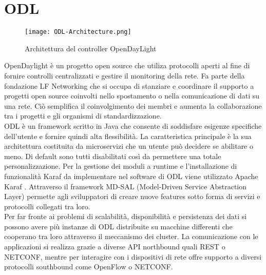 \chapter{ODL}
\begin{figure}[h]
    \centering
   \texttt{[image: ODL-Architecture.png]}
    \caption{Architettura del controller OpenDayLight}
    \label{fig:ArchODL}
\end{figure}
OpenDaylight \cite{ODL} è un progetto open source che utiliza protocolli aperti al fine di fornire controlli centralizzati e gestire il monitoring della rete.
Fa parte della fondazione LF Networking \cite{LFN} che si occupa di stanziare e coordinare il supporto a progetti open source coinvolti nello spostamento o nella comunicazione di dati su una rete.
Ciò semplifica il coinvolgimento dei membri e aumenta la collaborazione tra i progetti e gli organismi di standardizzazione.
\\ODL è un framework scritto in Java che consente di soddisfare esigenze specifiche dell'utente e fornire quindi alta flessibilità.
La caratteristica principale è la sua architettura costituita da microservizi che un utente può decidere se abilitare o meno. 
Di default sono tutti disabilitati così da permettere una totale personalizzazione.
Per la gestione dei moduli a runtime e l'installazione di funzionalità Karaf da implementare nel software di ODL viene utilizzato Apache Karaf \cite{Apache}.
Attraverso il framework MD-SAL (Model-Driven Service Abstraction Layer) permette agli sviluppatori di creare nuove features sotto forma di servizi e protocolli collegati tra loro.
\\Per far fronte ai problemi di scalabilità, disponibilità e persistenza dei dati si possono avere più instanze di ODL distribuite su macchine differenti che cooperano tra loro attraverso il meccanismo dei cluster.
La comunicazione con le applicazioni si realizza grazie a diverse API northbound quali REST o NETCONF, mentre per interagire 
con i dispositivi di rete offre supporto a diversi protocolli southbound come OpenFlow o NETCONF.


